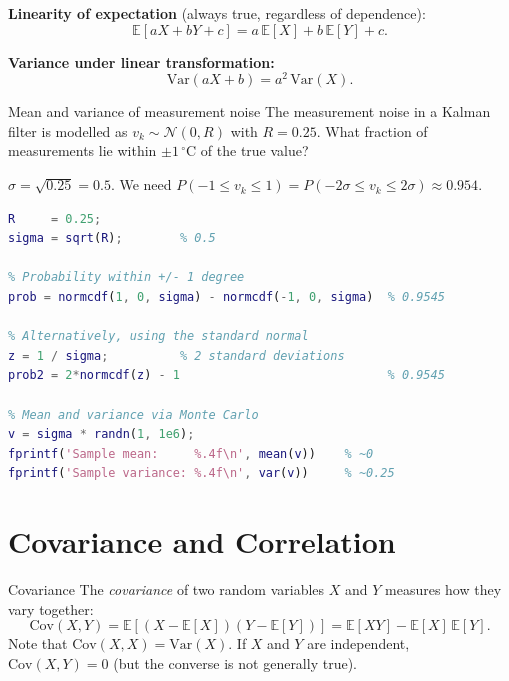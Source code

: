 \textbf{Linearity of expectation} (always true, regardless of
dependence):
\[
  \mathbb{E}[aX + bY + c] = a\,\mathbb{E}[X] + b\,\mathbb{E}[Y] + c.
\]

\textbf{Variance under linear transformation:}
\[
  \mathrm{Var}(aX + b) = a^2\,\mathrm{Var}(X).
\]

\begin{examplebox}{Mean and variance of measurement noise}
The measurement noise in a Kalman filter is modelled as
$v_k \sim \mathcal{N}(0, R)$ with $R = 0.25$.  What fraction of
measurements lie within $\pm 1\,^\circ$C of the true value?

\solution
$\sigma = \sqrt{0.25} = 0.5$.  We need
$P(-1 \leq v_k \leq 1) = P(-2\sigma \leq v_k \leq 2\sigma) \approx
0.954$.

\begin{lstlisting}[language=Matlab]
R     = 0.25;
sigma = sqrt(R);        % 0.5

% Probability within +/- 1 degree
prob = normcdf(1, 0, sigma) - normcdf(-1, 0, sigma)  % 0.9545

% Alternatively, using the standard normal
z = 1 / sigma;          % 2 standard deviations
prob2 = 2*normcdf(z) - 1                             % 0.9545

% Mean and variance via Monte Carlo
v = sigma * randn(1, 1e6);
fprintf('Sample mean:     %.4f\n', mean(v))    % ~0
fprintf('Sample variance: %.4f\n', var(v))     % ~0.25
\end{lstlisting}
\end{examplebox}

\section{Covariance and Correlation}
\label{sec:app_covariance}

\begin{defnbox}{Covariance}
The \emph{covariance} of two random variables $X$ and $Y$ measures
how they vary together:
\[
  \mathrm{Cov}(X,Y) = \mathbb{E}\!\left[(X - \mathbb{E}[X])
                       (Y - \mathbb{E}[Y])\right]
                     = \mathbb{E}[XY] - \mathbb{E}[X]\,\mathbb{E}[Y].
\]
Note that $\mathrm{Cov}(X,X) = \mathrm{Var}(X)$.  If $X$ and $Y$ are
independent, $\mathrm{Cov}(X,Y) = 0$ (but the converse is not
generally true).
\end{defnbox}

